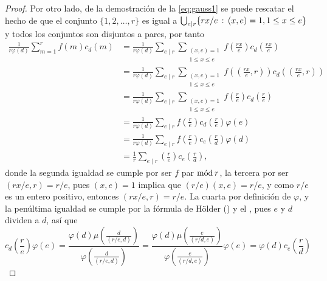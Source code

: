 \begin{proof}
Por otro lado, de la demostración de la \cref{eq:gauss1} se puede rescatar el hecho de que el conjunto $\{ 1,2,\ldots,r \}$ es igual a $\bigcup_{e \mid r} \{ rx/e \, : \, (x,e)=1, 1 \le x \le e \}$ y todos los conjuntos son disjuntos a pares, por tanto
\begin{equation*}
\begin{split}
    \frac{1}{r \varphi(d)}\sum_{m=1}^{r} f(m) c_d(m) &= \frac{1}{r \varphi(d)}\sum_{e \mid r} \sum_{\substack{(x,e)=1 \\ 1 \le x \le e}} f \left( \frac{rx}{e} \right) c_d \left( \frac{rx}{e} \right) \\
                               &= \frac{1}{r \varphi(d)}\sum_{e \mid r} \sum_{\substack{(x,e)=1 \\ 1 \le x \le e}} f \left( \left( \frac{rx}{e},r \right) \right) c_d \left( \left( \frac{rx}{e},r \right) \right) \\
                               &= \frac{1}{r \varphi(d)}\sum_{e \mid r} \sum_{\substack{(x,e)=1 \\ 1 \le x \le e}} f \left( \frac{r}{e} \right) c_d \left( \frac{r}{e} \right) \\
                               &= \frac{1}{r \varphi(d)}\sum_{e \mid r} f \left( \frac{r}{e} \right) c_d \left( \frac{r}{e} \right) \varphi(e) \\
                               &= \frac{1}{r \varphi(d)}\sum_{e \mid r} f \left( \frac{r}{e} \right) c_e \left( \frac{r}{d} \right) \varphi(d) \\
                               &= \frac{1}{r}\sum_{e \mid r} \left( \frac{r}{e} \right) c_e \left( \frac{r}{d} \right),
\end{split}
\end{equation*}
donde la segunda igualdad se cumple por ser $f$ par $\mathrm{m\acute{o}d\:}r$, la tercera por ser $(rx/e,r)=r/e$, pues $(x,e)=1$ implica que $(r/e)(x,e)=r/e$, y como $r/e$ es un entero positivo, entonces $(rx/e,r)=r/e$. La cuarta por definición de $\varphi$, y la penúltima igualdad se cumple por la fórmula de Hölder () y el , pues $e$ y $d$ dividen a $d$, así que
\begin{equation}\label{eq:holder}
    c_d \left( \frac{r}{e} \right) \varphi(e) = \frac{\varphi(d)\mu \left( \displaystyle \frac{d}{(r/e,d)} \right)}{\varphi \left( \displaystyle \frac{d}{(r/e,d)} \right)} = \frac{\varphi(d)\mu \left( \displaystyle \frac{e}{(r/d,e)} \right)}{\varphi \left( \displaystyle \frac{e}{(r/d,e)} \right)} \varphi(e) = \varphi(d) c_e \left( \frac{r}{d} \right)
\end{equation}
\end{proof}

